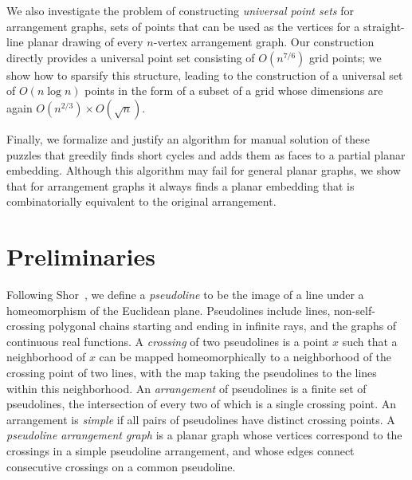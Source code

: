 \documentclass[oribibl]{llncs}
\begin{document}
We also investigate the problem of constructing \emph{universal point sets} for arrangement graphs, sets of points that can be used as the vertices for a straight-line planar drawing of every $n$-vertex arrangement graph. Our construction directly provides a universal point set consisting of $O(n^{7/6})$ grid points; we show how to sparsify this structure, leading to the construction of a universal set of $O(n\log n)$ points in the form of a subset of a grid whose dimensions are again $O(n^{2/3})\times O(\sqrt n)$.

Finally, we formalize and justify an algorithm for manual solution of these puzzles that greedily finds short cycles and adds them as faces to a partial planar embedding. Although this algorithm may fail for general planar graphs, we show that for arrangement graphs it always finds a planar embedding that is combinatorially equivalent to the original arrangement.

\section{Preliminaries}


Following Shor~\cite{Sho-VKF-91}, we define a \emph{pseudoline} to be the image of a line under a homeomorphism of the Euclidean plane. Pseudolines include lines, non-self-crossing polygonal chains starting and ending in infinite rays, and the graphs of continuous real functions. A \emph{crossing} of two pseudolines is a point $x$ such that a neighborhood of $x$ can be mapped homeomorphically to a neighborhood of the crossing point of two lines, with the map taking the pseudolines to the lines within this neighborhood. An \emph{arrangement} of pseudolines is a finite set of pseudolines, the intersection of every two of which is a single crossing point. An arrangement is \emph{simple} if all pairs of pseudolines have distinct crossing points. A \emph{pseudoline arrangement graph} is a planar graph whose vertices correspond to the crossings in a simple pseudoline arrangement, and whose edges connect consecutive crossings on a common pseudoline.
\end{document}
